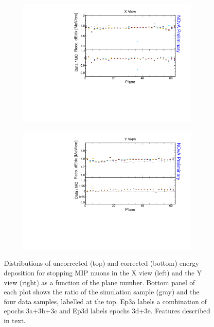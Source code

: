 \begin{figure}[!ht]
\begin{subfigure}{0.495\textwidth}
  \end{subfigure}
  \begin{subfigure}{0.495\textwidth}
    \includegraphics[width=\linewidth]{Plots/Calibana/recomevcm_plane_x.pdf}
  \end{subfigure}
  \begin{subfigure}{0.495\textwidth}
    \includegraphics[width=\linewidth]{Plots/Calibana/recomevcm_plane_y.pdf}
  \end{subfigure}
  \caption[Validation plots for stopping muons across planes]{Distributions of uncorrected (top) and corrected (bottom) energy deposition for stopping \acrshort{MIP} muons in the X view (left) and the Y view (right) as a function of the plane number. Bottom panel of each plot shows the ratio of the simulation sample (gray) and the four data samples, labelled at the top. Ep3a labels a combination of epochs 3a+3b+3c and Ep3d labels epochs 3d+3e. Features described in text.}
  \label{fig:AbsCalibPlane1}
\end{figure}

